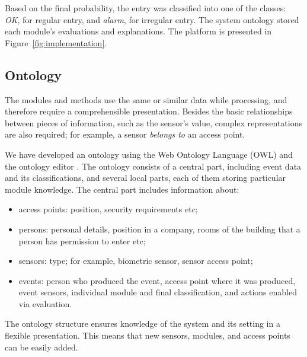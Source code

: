 Based on the final probability, the entry was classified into one of the classes: \textit{OK}, for regular entry, and \textit{alarm}, for irregular entry.
The system ontology stored each module's evaluations and explanations. The platform is presented in Figure~\ref{fig:implementation}. 


\subsection{Ontology}
\label{sec:ontology}

The modules and methods use the same or similar data while processing, and therefore require a comprehensible presentation. Besides the basic relationships between pieces of information, such as the sensor's value, complex representations are also required; for example, a sensor \textit{belongs to} an access point.

We have developed an ontology using the Web Ontology Language (OWL) \citep{Horrocks03} and the ontology editor \cite{Protege}. 
The ontology consists of a central part, including event data and its classifications, and several local parts, each of them storing particular module knowledge. The central part includes information about: 
\begin{itemize}
    \item  	access points: position, security requirements etc; 
    \item 	persons: personal details, position in a company, rooms of the building that a person has permission to enter etc; 
    \item 	sensors: type; for example, biometric sensor, sensor access point;   
    \item 	events: person who produced the event, access point where it was produced, event sensors, individual module and final classification, and actions enabled via evaluation.
\end{itemize}

The ontology structure ensures knowledge of the system and its setting in a flexible presentation. This means that new sensors, modules, and access points can be easily added.





%
%

